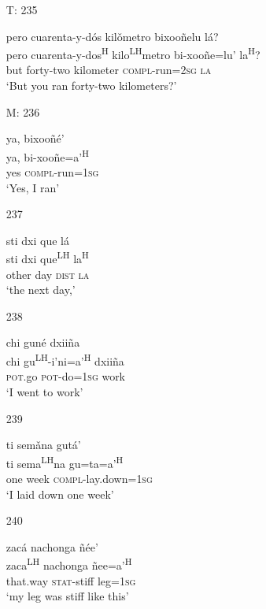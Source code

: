 \begin{itemize}
\item[T: 235]
 
pero cuarenta-y-d\'{o}s kil\v{o}metro bixoo\~{n}elu l\'{a}?\\
pero cuarenta-y-dos\textsuperscript{H} kilo\textsuperscript{LH}metro bi-xoo\~{n}e=lu' la\textsuperscript{H}?\\
but forty-two kilometer \textsc{compl}-run=\textsc{2sg} \textsc{la}\\
\glt `But you ran forty-two kilometers?'
 

\item[M: 236]
 
\glll   ya, bixoo\~{n}\'{e}'\\
 ya, bi-xoo\~{n}e=a'\textsuperscript{H}\\
yes \textsc{compl}-run=\textsc{1sg}\\
\glt `Yes, I ran'
 



\item[237]

\glll   sti dxi que l\'{a}\\
 sti dxi que\textsuperscript{LH} la\textsuperscript{H}\\
other day \textsc{dist} \textsc{la}\\
\glt `the next day,'
 

\item[238]
 
\glll   chi gun\'{e} dxii\~{n}a\\
  chi gu\textsuperscript{LH}-i'ni=a'\textsuperscript{H} dxii\~{n}a\\
\textsc{pot}.go \textsc{pot}-do=\textsc{1sg} work\\
\glt `I went to work'
 



\item[239]
 
\glll   ti sem\v{a}na gut\'{a}'\\
 ti sema\textsuperscript{LH}na gu=ta=a'\textsuperscript{H}\\
one week \textsc{compl}-lay.down=\textsc{1sg}\\
\glt `I laid down one week' 
 


\item[240]
 
\glll  zac\'{a} nachonga \~{n}\'{e}e'\\
zaca\textsuperscript{LH} nachonga \~{n}ee=a'\textsuperscript{H}\\
that.way \textsc{stat}-stiff leg=\textsc{1sg}\\
\glt `my leg was stiff like this'
 



\end{itemize}
